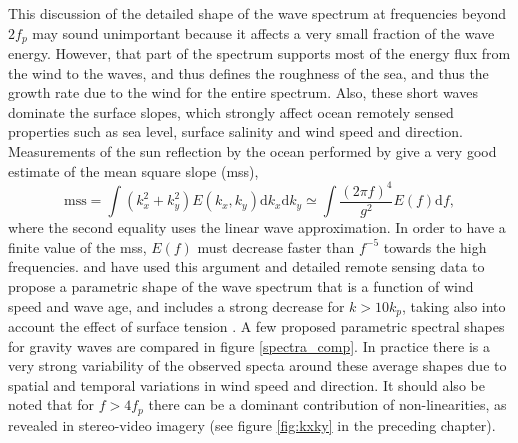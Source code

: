 This discussion of the detailed shape of the wave spectrum at frequencies beyond $2 f_p$ may sound unimportant because it affects a very small fraction of the wave energy.
However, that part of the spectrum supports most of the energy flux from the wind to the waves, and thus defines the roughness of the sea, and thus the growth rate due to the wind for
the entire spectrum. Also, these short waves dominate the surface slopes, which strongly affect ocean remotely sensed properties such as sea level, surface salinity and wind speed 
and direction. Measurements of the sun reflection by the ocean performed by \cite{Cox&Munk1954} give a very good estimate of the mean square slope (mss),
\begin{equation}
   \mathrm{mss}=\int \left(k_x^2+ k_y^2 \right) E(k_x,k_y) {\mathrm d} k_x {\mathrm d} k_y \simeq
   \int \frac{(2 \pi f)^4}{g^2} E(f) {\mathrm d} f, \label{eq:mss_int}
\end{equation}
where the second equality uses the linear wave approximation. In order to have a finite value of the mss, 
$E(f)$ must decrease faster than $f^{-5}$ towards the high frequencies. 
\cite{Elfouhaily&al.1997} and \cite{Kudryavtsev&al.1999} have used this argument and detailed remote sensing data to propose a parametric 
shape of the wave spectrum that is a function of wind speed and wave age, and includes a strong decrease for  $k> 10 k_p$, 
taking also into account the effect of surface tension \citep[see also][]{Dulov&Kosnik2009,Yurovskaya&al.2013}.
A few proposed parametric spectral shapes for gravity waves are compared in figure \ref{spectra_comp}. In practice there is a very strong variability 
of the observed specta around these average shapes due to spatial and temporal variations in wind speed and direction.
It should also be noted that for $f > 4 f_p$ there can be a dominant contribution of non-linearities, as revealed in stereo-video imagery (see figure \ref{fig:kxky} in 
the preceding chapter).

